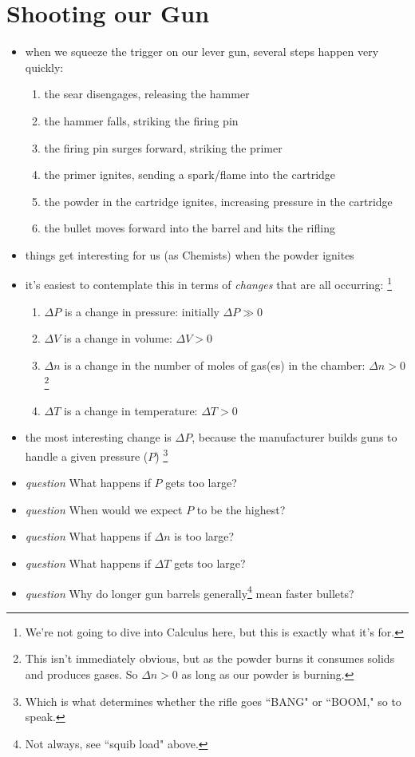 \documentclass[11pt, oneside]{article}   	%
\begin{document}
\section{Shooting our Gun}
\begin{itemize}
\item when we squeeze the trigger on our lever gun, several steps happen very quickly:
\begin{enumerate}
\item the sear disengages, releasing the hammer
\item the hammer falls, striking the firing pin
\item the firing pin surges forward, striking the primer
\item the primer ignites, sending a spark/flame into the cartridge
\item the powder in the cartridge ignites, increasing pressure in the cartridge
\item the bullet moves forward into the barrel and hits the rifling
\end{enumerate}
\item things get interesting for us (as Chemists) when the powder ignites
\item it's easiest to contemplate this in terms of \emph{changes} that are all occurring:
\footnote{We're not going to dive into Calculus here, but this is exactly what it's for.}
\begin{enumerate}
\item $\Delta P$ is a change in pressure: initially $\Delta P \gg 0$ 

\item $\Delta V$ is a change in volume: $\Delta V > 0$ 
\item $\Delta n$ is a change in the number of moles of gas(es) in the chamber: $\Delta n > 0$
\footnote{This isn't immediately obvious, but as the powder burns it consumes solids and produces gases. So $\Delta n > 0$ as long as our powder is burning.}
\item $\Delta T$ is a change in temperature: $\Delta T > 0$
\end{enumerate}
\item the most interesting change is $\Delta P$, because the manufacturer builds guns to handle a given pressure ($P$)
\footnote{Which is what determines whether the rifle goes ``BANG" or ``BOOM," so to speak.}
\item \emph{question} What happens if $P$ gets too large?
\item \emph{question} When would we expect $P$ to be the highest?
\item \emph{question} What happens if $\Delta n$ is too large? 
\item \emph{question} What happens if $\Delta T$ gets too large?
\item \emph{question} Why do longer gun barrels generally\footnote{Not always, see ``squib load" above.} mean faster bullets?
\end{itemize}
\end{document}

